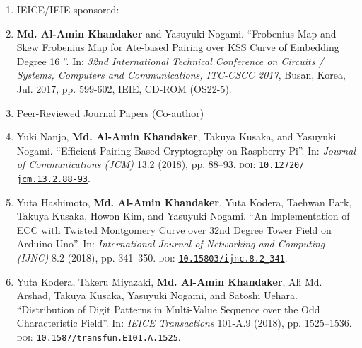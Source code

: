 \begin{enumerate}
	\vspace{5mm}
	\item[ ] \Large IEICE/IEIE sponsored:
	\normalsize
	\item \textbf{Md. Al-Amin Khandaker} and Yasuyuki Nogami. ``Frobenius Map and Skew Frobenius Map for Ate-based Pairing over KSS Curve of Embedding Degree 16 ''. In: \textit{32nd International Technical Conference on Circuits / Systems, Computers and Communications, ITC-CSCC 2017},  Busan, Korea, Jul. 2017, pp. 599-602, IEIE, CD-ROM (OS22-5).
	
	
	\vspace{10mm}
	\clearpage
	\Large
	\item[] Peer-Reviewed Journal Papers  (Co-author)
	\normalsize
	
	\normalsize
	\item Yuki Nanjo, \textbf{Md. Al-Amin Khandaker}, Takuya Kusaka, and Yasuyuki Nogami. “Efficient Pairing-Based Cryptography on Raspberry Pi”. In: \textit{Journal of Communications (JCM)} 13.2 (2018), pp. 88–93. \textsc{doi}: \href{https://doi.org/10.12720/jcm.13.2.88-93}{\texttt{10.12720/\\jcm.13.2.88-93}}.
	
	\normalsize
	\item Yuta Hashimoto, \textbf{Md. Al-Amin Khandaker}, Yuta Kodera, Taehwan Park, Takuya Kusaka, Howon Kim, and Yasuyuki Nogami. ``An Implementation of ECC with Twisted Montgomery Curve over 32nd Degree Tower Field on Arduino Uno''. In: \textit{International Journal of Networking and Computing (IJNC)} 8.2 (2018), pp. 341–350. \textsc{doi}: \href{https://doi.org/10.15803/ijnc.8.2_341}{\texttt{10.15803/ijnc.8.2\_341}}.
	
	\normalsize
	\item Yuta Kodera, Takeru Miyazaki, \textbf{Md. Al-Amin Khandaker}, Ali Md. Arshad, Takuya Kusaka, Yasuyuki Nogami, and Satoshi Uehara. ``Distribution of Digit Patterns in Multi-Value Sequence over the Odd Characteristic Field''. In: \textit{IEICE Transactions} 101-A.9 (2018), pp. 1525–1536. \textsc{doi}: \href{https://doi.org/10.1587/transfun.E101.A.1525}{\texttt{10.1587/transfun.E101.A.1525}}.
	

\end{enumerate}
